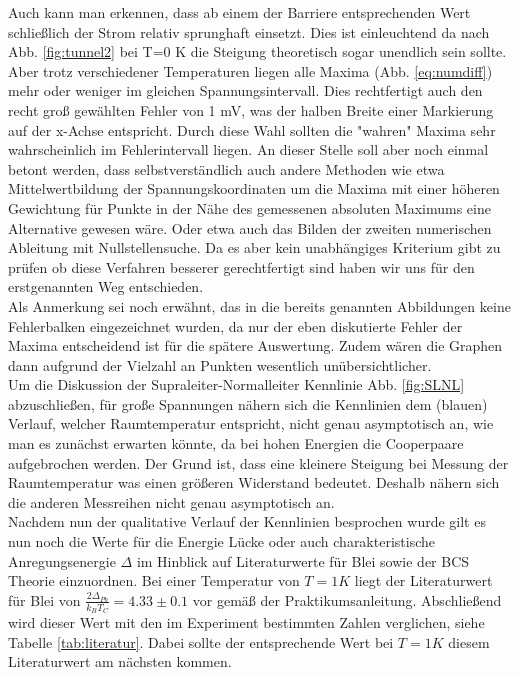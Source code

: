 \documentclass[twoside,        %
               BCOR12mm,       %
               english,ngerman, %
               fleqn,headsepline=false,footsepline=false
              ]{MFPREPORT}
\begin{document}
Auch kann man erkennen, dass ab einem der Barriere entsprechenden Wert schließlich der Strom relativ sprunghaft einsetzt. 
Dies ist einleuchtend da nach Abb. \ref{fig:tunnel2} bei T=0 K die Steigung theoretisch sogar unendlich sein sollte.
Aber trotz verschiedener Temperaturen liegen alle Maxima (Abb. \ref{eq:numdiff}) mehr oder weniger im gleichen Spannungsintervall.
Dies rechtfertigt auch den recht groß gewählten Fehler von 1 mV, was der halben Breite einer Markierung auf der x-Achse entspricht. 
Durch diese Wahl sollten die "wahren" Maxima sehr wahrscheinlich im Fehlerintervall liegen.
An dieser Stelle soll aber noch einmal betont werden, dass selbstverständlich auch andere Methoden wie etwa Mittelwertbildung der Spannungskoordinaten um die Maxima mit einer höheren Gewichtung für Punkte in der Nähe des gemessenen absoluten Maximums eine Alternative gewesen wäre. 
Oder etwa auch das Bilden der zweiten numerischen Ableitung mit Nullstellensuche.
Da es aber kein unabhängiges Kriterium gibt zu prüfen ob diese Verfahren besserer gerechtfertigt sind haben wir uns für den erstgenannten Weg entschieden.
\\
Als Anmerkung sei noch erwähnt, das in die bereits genannten Abbildungen keine Fehlerbalken eingezeichnet wurden, da nur der eben diskutierte Fehler der Maxima entscheidend ist für die spätere Auswertung.
Zudem wären die Graphen dann aufgrund der Vielzahl an Punkten wesentlich unübersichtlicher.
\\
Um die Diskussion der Supraleiter-Normalleiter Kennlinie Abb. \ref{fig:SLNL} abzuschließen,
für große Spannungen nähern sich die Kennlinien dem (blauen) Verlauf, welcher Raumtemperatur entspricht,
nicht genau asymptotisch an, wie man es zunächst erwarten könnte, da bei hohen Energien die Cooperpaare aufgebrochen werden.
Der Grund ist, dass eine kleinere Steigung bei Messung der Raumtemperatur was einen größeren Widerstand bedeutet. Deshalb nähern sich die anderen Messreihen nicht genau asymptotisch an.
\\
Nachdem nun der qualitative Verlauf der Kennlinien besprochen wurde gilt es nun noch die Werte für die Energie Lücke oder auch charakteristische Anregungsenergie $\Delta$ im Hinblick auf Literaturwerte für Blei sowie der BCS Theorie einzuordnen.
Bei einer Temperatur von $T=1 K$ liegt der Literaturwert für Blei von 
$\frac{2 \Delta_{Pb}}{k_{B} T_{C}} = 4.33 \pm 0.1$ vor gemäß der Praktikumsanleitung.
Abschließend wird dieser Wert mit den im Experiment bestimmten Zahlen verglichen, siehe
Tabelle \ref{tab:literatur}.
Dabei sollte der entsprechende Wert bei $T=1 K$ diesem Literaturwert am nächsten kommen.
\end{document}
